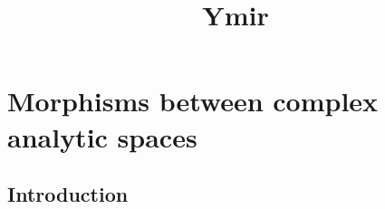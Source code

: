 



\title{Ymir}


\chapter*{Morphisms between complex analytic spaces}\label{chap-morphismcomplex}







\maketitle


\tableofcontents



\section{Introduction}\label{sec-introduction-morphisms}

\cite{stacks-project}

\printbibliography

